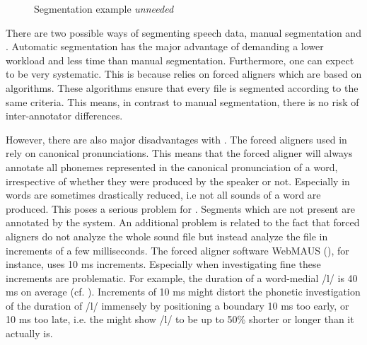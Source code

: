 \begin{figure}
	
	\caption{Segmentation example \textit{unneeded}}
	\label{fig:segmentation unneeded}
\end{figure}

There are two possible ways of segmenting speech data, manual segmentation and . Automatic segmentation has the major advantage of demanding a lower workload and less time than manual segmentation. Furthermore, one can expect  to be very systematic. This is because  relies on forced aligners which are based on algorithms. These algorithms ensure that every file is segmented according to the same criteria. This means, in contrast to manual segmentation, there is no risk of inter-annotator differences.

However, there are also major disadvantages with . The forced aligners used in  rely on canonical pronunciations. This means that the forced aligner will always annotate all phonemes represented in the canonical pronunciation of a word, irrespective of whether they were produced by the speaker or not.  Especially in  words are sometimes drastically reduced, i.e not all sounds of a word are produced. This poses a serious problem for . Segments which are not present are annotated by the system.
An additional problem is related to the fact that forced aligners do not analyze the whole sound file but instead analyze the file in increments of a few milliseconds. The forced aligner software WebMAUS (\citealt{Schiel.1999,Kisler.2016}), for instance, uses 10 ms increments. Especially when investigating fine  these increments are problematic. For example, the duration of a word-medial /l/ is 40 ms on average (cf. \citealt{Umeda.1977}). Increments of 10 ms might distort the phonetic investigation of the duration of /l/ immensely by positioning a boundary 10 ms too early, or 10 ms too late, i.e. the  might show /l/ to be up to 50\% shorter or longer than it actually is.

